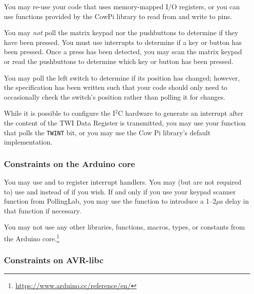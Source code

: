 You may re-use your code that uses memory-mapped I/O registers,
or you can use functions provided by the CowPi library to read from and write to pins.

You may \textit{not} poll the matrix keypad nor the pushbuttons to determine if they have been pressed.
You must use interrupts to determine if a key or button has been pressed.
Once a press has been detected, you may scan the matrix keypad or read the pushbuttons to determine which key or button has been pressed.

You may poll the left switch to determine if its position has changed;
however, the specification has been written such that your code should only need to occasionally check the switch's position rather than polling it for changes.


While it is possible to configure the I$^2$C hardware to generate an interrupt after the content of the TWI Data Register is transmitted,
you may use your  function that polls the \texttt{TWINT} bit,
or you may use the Cow Pi library's default implementation.

\subsubsection{Constraints on the Arduino core}

You may use  and  to register interrupt handlers.
You may (but are not required to) use  and  instead of  if you wish.
If and only if you use your keypad scanner function from PollingLab, you may use the  function to introduce a 1--2$\mu$s delay in that function if necessary.

You may not use any other libraries, functions, macros, types, or constants from the Arduino core.\footnote{
    \url{https://www.arduino.cc/reference/en/}
}

\subsubsection{Constraints on AVR-libc}

